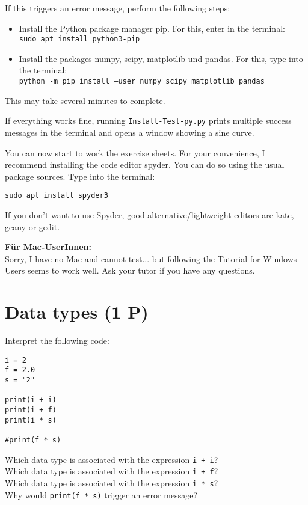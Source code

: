 \documentclass[
	english,
	fontsize=10pt,
	parskip=half,
	titlepage=true,
	DIV=12
]{scrartcl}
\newcommand*{\inPy}[1]{\texttt{#1}}
\begin{document}
If this triggers an error message, perform the following steps:
\begin{itemize}
\item Install the Python package manager pip. For this, enter in the terminal:\\
	\texttt{sudo apt install python3-pip}
\item Install the packages numpy, scipy, matplotlib und pandas. For this, type into the terminal:\\
	\texttt{python -m pip install --user numpy scipy matplotlib pandas}
\end{itemize}
This may take several minutes to complete.

If everything works fine, running \texttt{Install-Test-py.py} prints multiple success messages in the terminal and opens a window showing a sine curve.

You can now start to work the exercise sheets. For your convenience, I recommend installing the code editor spyder. You can do so using the usual package sources. Type into the terminal:
\begin{center}
\texttt{sudo apt install spyder3}
\end{center}

If you don't want to use Spyder, good alternative/lightweight editors are kate, geany or gedit.

\textbf{Für Mac-UserInnen:}\\
Sorry, I have no Mac and cannot test... but following the Tutorial for Windows Users seems to work well. Ask your tutor if you have any questions.


\section{Data types (1 P)}
Interpret the following code:
\begin{verbatim}
i = 2
f = 2.0
s = "2"

print(i + i)
print(i + f)
print(i * s)

#print(f * s)
\end{verbatim}

Which data type is associated with the expression \inPy{i + i}?\\
Which data type is associated with the expression \inPy{i + f}?\\
Which data type is associated with the expression \inPy{i * s}?\\
Why would \inPy{print(f * s)} trigger an error message?
\end{document}
